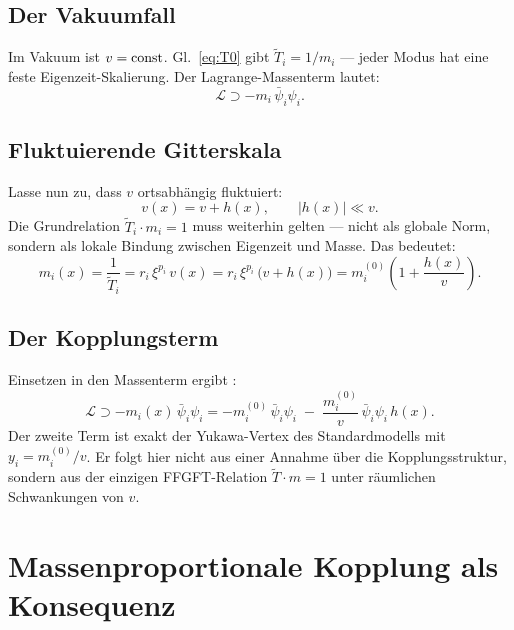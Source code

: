 \subsection{Der Vakuumfall}

Im Vakuum ist $v = {\rm const}$. Gl.~\eqref{eq:T0} gibt
$\tilde T_i = 1/m_i$ --- jeder Modus hat eine feste Eigenzeit-Skalierung.
Der Lagrange-Massenterm lautet:
\begin{equation}
  \mathcal L \supset -m_i\,\bar\psi_i\psi_i.
\end{equation}

\subsection{Fluktuierende Gitterskala}

Lasse nun zu, dass $v$ ortsabhängig fluktuiert:
\begin{equation}
  v(x) = v + h(x), \qquad |h(x)| \ll v.
\end{equation}
Die Grundrelation $\tilde T_i\cdot m_i = 1$ muss weiterhin gelten ---
nicht als globale Norm, sondern als lokale Bindung zwischen Eigenzeit und
Masse. Das bedeutet:
\begin{equation}
  m_i(x) = \frac{1}{\tilde T_i} = r_i\,\xi^{p_i}\,v(x)
  = r_i\,\xi^{p_i}\,\bigl(v + h(x)\bigr)
  = m_i^{(0)}\!\left(1 + \frac{h(x)}{v}\right).
  \label{eq:m_local}
\end{equation}

\subsection{Der Kopplungsterm}

Einsetzen in den Massenterm ergibt \BM:
\begin{equation}
  \mathcal L \supset -m_i(x)\,\bar\psi_i\psi_i
  = -m_i^{(0)}\,\bar\psi_i\psi_i
    \;-\; \frac{m_i^{(0)}}{v}\,\bar\psi_i\psi_i\,h(x).
  \label{eq:yukawa_derived}
\end{equation}
Der zweite Term ist exakt der Yukawa-Vertex des Standardmodells mit
$y_i = m_i^{(0)}/v$. Er folgt hier nicht aus einer Annahme über die
Kopplungsstruktur, sondern aus der einzigen FFGFT-Relation $\tilde T\cdot m = 1$
unter räumlichen Schwankungen von $v$.

\section{Massenproportionale Kopplung als Konsequenz}


